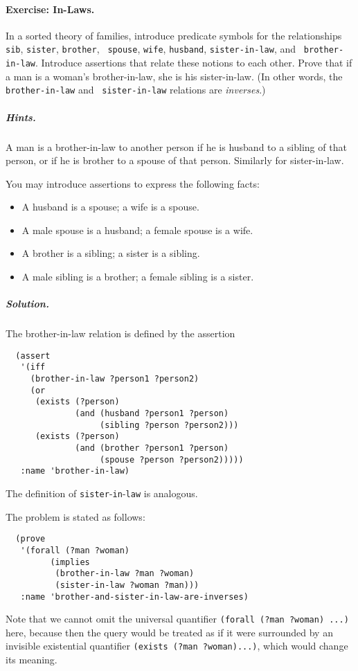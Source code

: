 \paragraph{Exercise: In-Laws.}
\label{exer-in-laws}
In a sorted theory of families, introduce predicate symbols for the
relationships {\tt sib}, {\tt sister}, {\tt brother}, {\tt
spouse}, {\tt wife}, {\tt husband}, {\tt sister-in-law}, and {\tt
brother-in-law}.  Introduce assertions that relate these notions to each
other.  Prove that if a man is a woman's brother-in-law, she is his
sister-in-law.  (In other words, the {\tt brother-in-law} and {\tt
sister-in-law} relations are {\em inverses}.)
\subparagraph{Hints.}  A man is a brother-in-law to another person if
he is husband to a sibling of that person, or if he is brother to a
spouse of that person.  Similarly for sister-in-law.

You may introduce assertions to express the following facts:
\begin{itemize}

\item[] A husband is a spouse; a wife is a spouse.

\item[] A male spouse is a husband; a female spouse is a wife.

\item[] A brother is a sibling; a sister is a sibling.

\item[] A male sibling is a brother; a female sibling is a sister.

\end{itemize}

\subparagraph{Solution.} The brother-in-law relation is defined by the
assertion
\begin{verbatim}
  (assert
   '(iff
     (brother-in-law ?person1 ?person2)
     (or
      (exists (?person)
              (and (husband ?person1 ?person)
                   (sibling ?person ?person2)))
      (exists (?person)
              (and (brother ?person1 ?person)
                   (spouse ?person ?person2)))))
   :name 'brother-in-law)
\end{verbatim}
The definition of {\tt sister}-{\tt in}-{\tt law} is analogous.

The problem is stated as follows:
\begin{verbatim}
  (prove
   '(forall (?man ?woman)
         (implies
          (brother-in-law ?man ?woman)
          (sister-in-law ?woman ?man)))
   :name 'brother-and-sister-in-law-are-inverses)
\end{verbatim}
Note that we cannot omit the universal quantifier {\tt (forall (?man
?woman) ...)}  here, because then the query would be treated as if it were
surrounded by an invisible existential quantifier
\verb'(exists (?man ?woman)...)', which would change its meaning.


